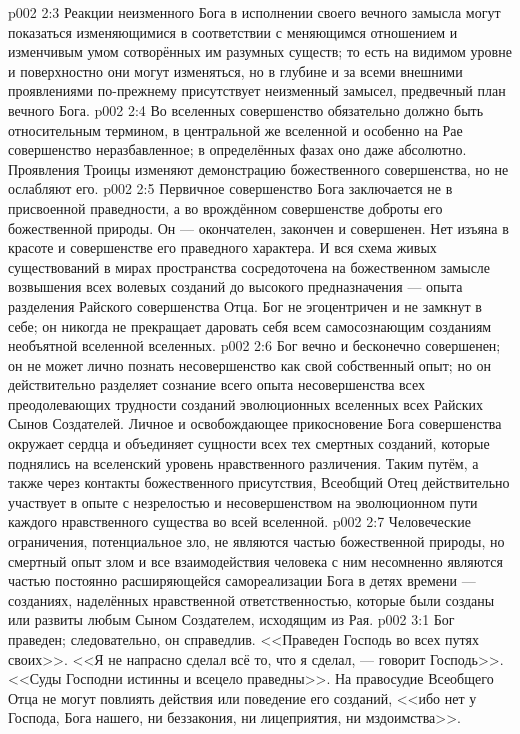 \vs p002 2:3 \pc Реакции неизменного Бога в исполнении своего вечного замысла могут показаться изменяющимися в соответствии с меняющимся отношением и изменчивым умом сотворённых им разумных существ; то есть на видимом уровне и поверхностно они могут изменяться, но в глубине и за всеми внешними проявлениями по\hyp{}прежнему присутствует неизменный замысел, предвечный план вечного Бога.
\vs p002 2:4 Во вселенных совершенство обязательно должно быть относительным термином, в центральной же вселенной и особенно на Рае совершенство неразбавленное; в определённых фазах оно даже абсолютно. Проявления Троицы изменяют демонстрацию божественного совершенства, но не ослабляют его.
\vs p002 2:5 \pc Первичное совершенство Бога заключается не в присвоенной праведности, а во врождённом совершенстве доброты его божественной природы. Он --- окончателен, закончен и совершенен. Нет изъяна в красоте и совершенстве его праведного характера. И вся схема живых существований в мирах пространства сосредоточена на божественном замысле возвышения всех волевых созданий до высокого предназначения --- опыта разделения Райского совершенства Отца. Бог не эгоцентричен и не замкнут в себе; он никогда не прекращает даровать себя всем самосознающим созданиям необъятной вселенной вселенных.
\vs p002 2:6 Бог вечно и бесконечно совершенен; он не может лично познать несовершенство как свой собственный опыт; но он действительно разделяет сознание всего опыта несовершенства всех преодолевающих трудности созданий эволюционных вселенных всех Райских Сынов Создателей. Личное и освобождающее прикосновение Бога совершенства окружает сердца и объединяет сущности всех тех смертных созданий, которые поднялись на вселенский уровень нравственного различения. Таким путём, а также через контакты божественного присутствия, Всеобщий Отец действительно участвует в опыте  с незрелостью и несовершенством на эволюционном пути каждого нравственного существа во всей вселенной.
\vs p002 2:7 Человеческие ограничения, потенциальное зло, не являются частью божественной природы, но смертный опыт  злом и все взаимодействия человека с ним несомненно являются частью постоянно расширяющейся самореализации Бога в детях времени --- созданиях, наделённых нравственной ответственностью, которые были созданы или развиты любым Сыном Создателем, исходящим из Рая.
\vs p002 3:1 Бог праведен; следовательно, он справедлив. <<Праведен Господь во всех путях своих>>. <<Я не напрасно сделал всё то, что я сделал, --- говорит Господь>>. <<Суды Господни истинны и всецело праведны>>. На правосудие Всеобщего Отца не могут повлиять действия или поведение его созданий, <<ибо нет у Господа, Бога нашего, ни беззакония, ни лицеприятия, ни мздоимства>>.
